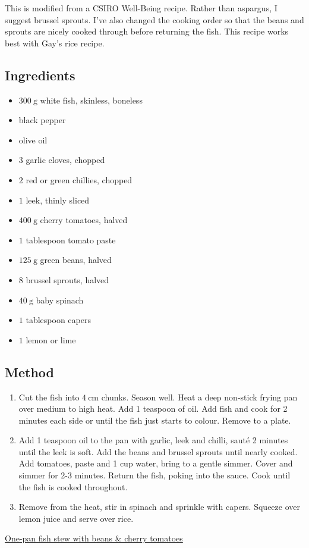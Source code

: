 \documentclass[11pt,a4paper]{article}
\begin{document}
This is modified from a CSIRO Well-Being recipe. Rather than aspargus, I suggest brussel sprouts. 
I've also changed the cooking order so that the beans and sprouts are nicely cooked through before
returning the fish. This recipe works best with Gay's rice recipe.

\subsection*{Ingredients}

\begin{itemize}
  \item $ \qty{300}{\gram} $ white fish, skinless, boneless
  \item black pepper
  \item olive oil
  \item $ 3 $ garlic cloves, chopped
  \item $ 2 $ red or green chillies, chopped
  \item $ 1 $ leek, thinly sliced
  \item $ \qty{400}{\gram} $ cherry tomatoes, halved
  \item $ 1 $ tablespoon tomato paste
  \item $ \qty{125}{\gram} $ green beans, halved
  \item $ 8 $ brussel sprouts, halved
  \item $ \qty{40}{\gram} $ baby spinach
  \item $ 1 $ tablespoon capers
  \item $ 1 $ lemon or lime
\end{itemize}

\medskip

\subsection*{Method}

\begin{enumerate}
  \item Cut the fish into $ \qty{4}{\cm} $ chunks. Season well. Heat a deep non-stick frying pan over medium to high heat. Add 1 teaspoon of oil. Add fish and cook for 2 minutes each side or until the fish just starts to colour. Remove to a plate.
  \item Add 1 teaspoon oil to the pan with garlic, leek and chilli, sauté 2 minutes until the leek is soft. Add the beans and brussel sprouts until nearly cooked. Add tomatoes, paste and 1 cup water, bring to a gentle simmer. Cover and simmer for 2-3 minutes. Return the fish, poking into the sauce. Cook until the fish is cooked throughout. 
  \item Remove from the heat, stir in spinach and sprinkle with capers. Squeeze over lemon juice and serve over rice.
\end{enumerate}

\href{https://www.totalwellbeingdiet.com/au/recipes/quick-easy-recipes/one-pan-fish-stew-with-beans-cherry-tomatoes}{One-pan fish stew with beans \& cherry tomatoes}
\end{document}
